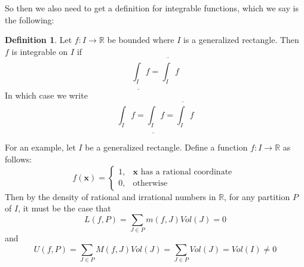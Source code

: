 \documentclass{article}
\theoremstyle{definition}
\newtheorem{definition}{Definition}[section]
\begin{document}
So then we also need to get a definition for integrable functions, which we say is the following:
\begin{definition}
    Let $f: I \rightarrow \mathbb{R}$ be bounded where $I$ is a generalized rectangle.
    Then $f$ is integrable on $I$ if 
    \[
        \underline{\int_I}f = \overline{\int_I}f
    \]
    In which case we write 
    \[
        \int_I f = \underline{\int_I}f = \overline{\int_I}f
    \]
\end{definition}
For an example, let $I$ be a generalized rectangle.
Define a function $f:I \rightarrow \mathbb{R}$ as follows:
\[
    f(\bm x) = \begin{cases}
        1, & \bm x \text{ has a rational coordinate } \\
        0, & \text{otherwise}
    \end{cases}
\]
Then by the density of rational and irrational numbers in $\mathbb{R}$, for any partition $P$ of $I$,
it must be the case that 
\[
    L(f,P) = \sum_{J \in P}m(f,J) Vol(J) = 0
\]
and 
\[
    U(f,P) = \sum_{J \in P}M(f,J) Vol(J) = \sum_{J \in P} Vol(J) = Vol(I) \neq 0
\]
\end{document}
